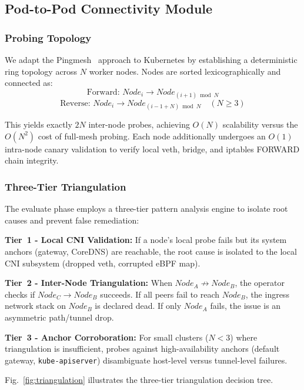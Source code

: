 \documentclass[conference]{IEEEtran}
\begin{document}
\subsection{Pod-to-Pod Connectivity Module}

\subsubsection{Probing Topology}
We adapt the Pingmesh~\cite{pingmesh2015} approach to Kubernetes by establishing a deterministic ring topology across $N$ worker nodes. Nodes are sorted lexicographically and connected as:
\begin{equation}
  \text{Forward: } Node_i \to Node_{(i+1) \bmod N}
\end{equation}
\begin{equation}
  \text{Reverse: } Node_i \to Node_{(i-1+N) \bmod N} \quad (N \geq 3)
\end{equation}

This yields exactly $2N$ inter-node probes, achieving $O(N)$ scalability versus the $O(N^2)$ cost of full-mesh probing. Each node additionally undergoes an $O(1)$ intra-node canary validation to verify local veth, bridge, and iptables FORWARD chain integrity.

\subsubsection{Three-Tier Triangulation}
The evaluate phase employs a three-tier pattern analysis engine to isolate root causes and prevent false remediation:

\noindent\textbf{Tier~1 - Local CNI Validation:} If a node's local probe fails but its system anchors (gateway, CoreDNS) are reachable, the root cause is isolated to the local CNI subsystem (dropped veth, corrupted eBPF map).

\noindent\textbf{Tier~2 - Inter-Node Triangulation:} When $Node_A \not\to Node_B$, the operator checks if $Node_C \to Node_B$ succeeds. If all peers fail to reach $Node_B$, the ingress network stack on $Node_B$ is declared dead. If only $Node_A$ fails, the issue is an asymmetric path/tunnel drop.

\noindent\textbf{Tier~3 - Anchor Corroboration:} For small clusters ($N < 3$) where triangulation is insufficient, probes against high-availability anchors (default gateway, \texttt{kube-apiserver}) disambiguate host-level versus tunnel-level failures.

Fig.~\ref{fig:triangulation} illustrates the three-tier triangulation decision tree.
\end{document}
